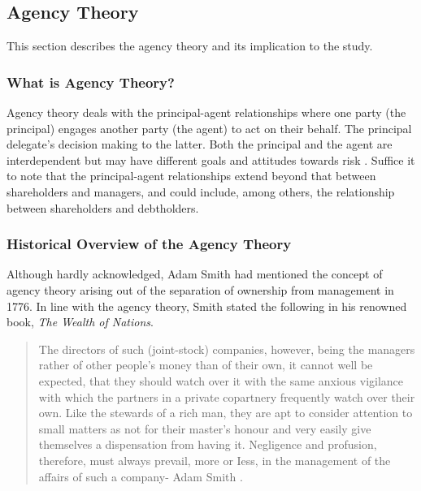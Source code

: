 \documentclass[a4paper, nobind]{templates/ociamthesis}
\begin{document}
\hypertarget{agency-theory}{%
\subsection{Agency Theory}\label{agency-theory}}

\noindent This section describes the agency theory and its implication to the study.

\hypertarget{what-is-agency-theory}{%
\subsubsection{What is Agency Theory?}\label{what-is-agency-theory}}

\noindent Agency theory deals with the principal-agent relationships where one party (the principal) engages another party (the agent) to act on their behalf. The principal delegate's decision making to the latter. Both the principal and the agent are interdependent but may have different goals and attitudes towards risk \autocite{ballwieser2012agency,eisenhardt1989agency}. Suffice it to note that the principal-agent relationships extend beyond that between shareholders and managers, and could include, among others, the relationship between shareholders and debtholders.

\hypertarget{historical-overview-of-the-agency-theory}{%
\subsubsection{Historical Overview of the Agency Theory}\label{historical-overview-of-the-agency-theory}}

\noindent Although hardly acknowledged, Adam Smith had mentioned the concept of agency theory arising out of the separation of ownership from management in 1776. In line with the agency theory, Smith stated the following in his renowned book, \emph{The Wealth of Nations}.

\begin{quote}
The directors of such (joint-stock) companies, however, being the managers rather of other people's money than of their own, it cannot well be expected, that they should watch over it with the same anxious vigilance with which the partners in a private copartnery frequently watch over their own. Like the stewards of a rich man, they are apt to consider attention to small matters as not for their master's honour and very easily give themselves a dispensation from having it. Negligence and profusion, therefore, must always prevail, more or Iess, in the management of the affairs of such a company- Adam Smith \autocite{jensen1976theory}.
\end{quote}
\end{document}
